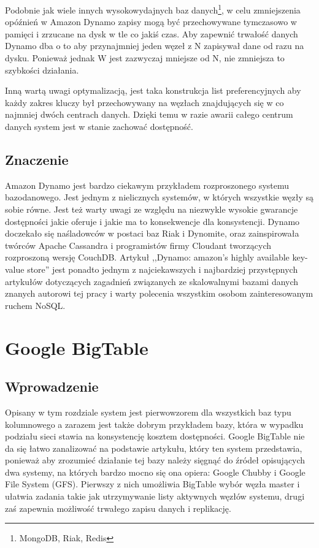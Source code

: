 Podobnie jak wiele innych wysokowydajnych baz danych\footnote{MongoDB, Riak, Redis}, w celu zmniejszenia opóźnień w Amazon Dynamo zapisy mogą być przechowywane tymczasowo w pamięci i zrzucane na dysk w tle co jakiś czas.
Aby zapewnić trwałość danych Dynamo dba o to aby przynajmniej jeden węzeł z N zapisywał dane od razu na dysku.
Ponieważ jednak W jest zazwyczaj mniejsze od N, nie zmniejsza to szybkości działania.

Inną wartą uwagi optymalizacją, jest taka konstrukcja list preferencyjnych aby każdy zakres kluczy był przechowywany na węzłach znajdujących się w co najmniej dwóch centrach danych.
Dzięki temu w razie awarii całego centrum danych system jest w stanie zachować dostępność.

\subsection*{Znaczenie}

Amazon Dynamo jest bardzo ciekawym przykładem rozproszonego systemu bazodanowego.
Jest jednym z nielicznych systemów, w których wszystkie węzły są sobie równe.
Jest też warty uwagi ze względu na niezwykle wysokie gwarancje dostępności jakie oferuje i jakie ma to konsekwencje dla konsystencji.
Dynamo doczekało się naśladowców w postaci baz Riak i Dynomite, oraz zainspirowała twórców Apache Cassandra i programistów firmy Cloudant tworzących rozproszoną wersję CouchDB.
Artykuł ,,Dynamo: amazon's highly available key-value store'' \cite{amazon-dynamo} jest ponadto jednym z najciekawszych i najbardziej przystępnych artykułów dotyczących zagadnień związanych ze skalowalnymi bazami danych znanych autorowi tej pracy i warty polecenia wszystkim osobom zainteresowanym ruchem NoSQL.

\section{Google BigTable}

\subsection*{Wprowadzenie}

Opisany w tym rozdziale system jest pierwowzorem dla wszystkich baz typu kolumnowego a zarazem jest także dobrym przykładem bazy, która w wypadku podziału sieci stawia na konsystencję kosztem dostępności.
Google BigTable nie da się łatwo zanalizować na podstawie artykułu, który ten system przedstawia, ponieważ aby zrozumieć działanie tej bazy należy sięgnąć do źródeł opisujących dwa systemy, na których bardzo mocno się ona opiera: Google Chubby i Google File System (GFS).
Pierwszy z nich umożliwia BigTable wybór węzła master i ułatwia zadania takie jak utrzymywanie listy aktywnych węzłów systemu, drugi zaś zapewnia możliwość trwałego zapisu danych i replikację.


